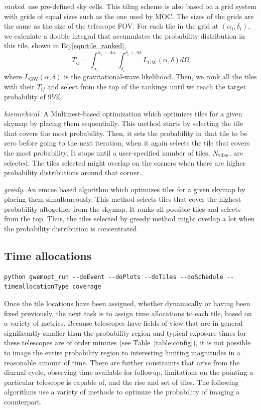\documentclass[twocolumn]{aastex61}
\begin{document}
\emph{ranked}. \cite{GhBl2016} use pre-defined sky cells. This tiling scheme is also based on a grid system with grids of equal sizes such as the one used by MOC. The sizes of the grids are the same as the size of the telescope FOV. For each tile in the grid at $(\alpha_i, \delta_i)$, we calculate a double integral that accumulates the probability distribution in this tile, shown in Eq.\ref{eqn:tile_ranked},
\begin{equation}\label{eqn:tile_ranked}
T_{ij} = \int_{\alpha_i}^{\alpha_i+\Delta \alpha}\int_{\delta_i}^{\delta_i+\Delta \delta}L_\textrm{GW}(\alpha,\delta)d\Omega
\end{equation}
where $L_\textrm{GW}(\alpha,\delta)$ is the gravitational-wave likelihood.
Then, we rank all the tiles with their $T_{ij}$ and select from the top of the rankings until we reach the target probability of 95\%.

\emph{hierarchical}. A Multinest-based \citep{FeHo2009,FeGa2009,BuGe2014} optimization which optimizes tiles for a given skymap by placing them sequentially. This method starts by selecting the tile that covers the most probability. Then, it sets the probability in that tile to be zero before going to the next iteration, when it again selects the tile that covers the most probability. It stops until a user-specified number of tiles, $N_{\rm tiles}$, are selected. The tiles selected might overlap on the corners when there are higher probability distributions around that corner. 
 
\emph{greedy}. An emcee \citep{FoHo2013} based algorithm which optimizes tiles for a given skymap by placing them simultaneously. This method selects tiles that cover the highest probability altogether from the skymap. It ranks all possible tiles and selects from the top. Thus, the tiles selected by greedy method might overlap a lot when the probability distribution is concentrated.

\subsection{Time allocations}
\begin{lstlisting}
python gwemopt_run --doEvent --doPlots --doTiles --doSchedule --timeallocationType coverage
\end{lstlisting}
Once the tile locations have been assigned, whether dynamically or having been fixed previously, the next task is to assign time allocations to each tile, based on a variety of metrics. 
Because telescopes have fields of view that are in general significantly smaller than the probability region and typical exposure times for these telescopes are of order minutes (see Table~\ref{table:config}), it is not possible to image the entire probability region to interesting limiting magnitudes in a reasonable amount of time.
There are further constraints that arise from the diurnal cycle, observing time available for followup, limitations on the pointing a particular telescope is capable of, and the rise and set of tiles.
The following algorithms use a variety of methods to optimize the probability of imaging a counterpart.
\end{document}
